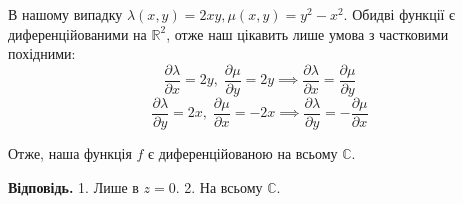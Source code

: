 \documentclass[12pt]{extarticle}
\begin{document}
В нашому випадку $\lambda(x,y) = 2xy, \mu(x,y) = y^2 - x^2$. Обидві функції є диференційованими на $\mathbb{R}^2$, отже наш цікавить лише умова з частковими похідними:
\[
\frac{\partial \lambda}{\partial x} = 2y, \; \frac{\partial \mu}{\partial y} = 2y \implies \frac{\partial \lambda}{\partial x} = \frac{\partial \mu}{\partial y}
\]
\[
\frac{\partial \lambda}{\partial y} = 2x, \; \frac{\partial \mu}{\partial x} = -2x \implies \frac{\partial \lambda}{\partial y} = -\frac{\partial \mu}{\partial x}
\]

Отже, наша функція $f$ є диференційованою на всьому $\mathbb{C}$.

\textbf{Відповідь.} 1. Лише в $z = 0$. 2. На всьому $\mathbb{C}$. 
\end{document}
